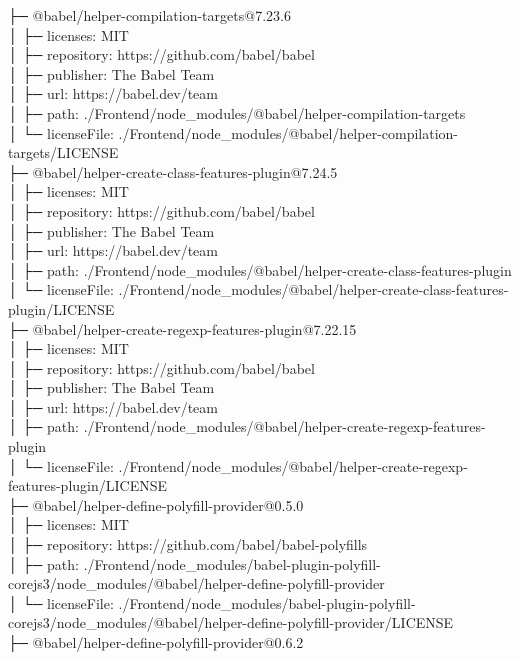├─ @babel/helper-compilation-targets@7.23.6\\
│  ├─ licenses: MIT\\
│  ├─ repository: https://github.com/babel/babel\\
│  ├─ publisher: The Babel Team\\
│  ├─ url: https://babel.dev/team\\
│  ├─ path: ./Frontend/node\_modules/@babel/helper-compilation-targets\\
│  └─ licenseFile: ./Frontend/node\_modules/@babel/helper-compilation-targets/LICENSE\\
├─ @babel/helper-create-class-features-plugin@7.24.5\\
│  ├─ licenses: MIT\\
│  ├─ repository: https://github.com/babel/babel\\
│  ├─ publisher: The Babel Team\\
│  ├─ url: https://babel.dev/team\\
│  ├─ path: ./Frontend/node\_modules/@babel/helper-create-class-features-plugin\\
│  └─ licenseFile: ./Frontend/node\_modules/@babel/helper-create-class-features-plugin/LICENSE\\
├─ @babel/helper-create-regexp-features-plugin@7.22.15\\
│  ├─ licenses: MIT\\
│  ├─ repository: https://github.com/babel/babel\\
│  ├─ publisher: The Babel Team\\
│  ├─ url: https://babel.dev/team\\
│  ├─ path: ./Frontend/node\_modules/@babel/helper-create-regexp-features-plugin\\
│  └─ licenseFile: ./Frontend/node\_modules/@babel/helper-create-regexp-features-plugin/LICENSE\\
├─ @babel/helper-define-polyfill-provider@0.5.0\\
│  ├─ licenses: MIT\\
│  ├─ repository: https://github.com/babel/babel-polyfills\\
│  ├─ path: ./Frontend/node\_modules/babel-plugin-polyfill-corejs3/node\_modules/@babel/helper-define-polyfill-provider\\
│  └─ licenseFile: ./Frontend/node\_modules/babel-plugin-polyfill-corejs3/node\_modules/@babel/helper-define-polyfill-provider/LICENSE\\
├─ @babel/helper-define-polyfill-provider@0.6.2\\
